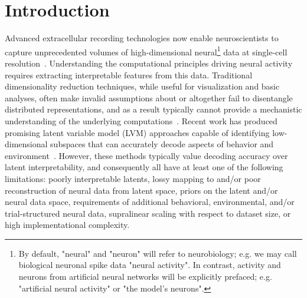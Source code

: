 \section{Introduction}

Advanced extracellular recording technologies now enable neuroscientists to capture unprecedented volumes of high-dimensional neural\footnote{By default, "neural" and "neuron" will refer to neurobiology; e.g. we may call biological neuronal spike data "neural activity". In contrast, activity and neurons from artificial neural networks will be explicitly prefaced; e.g. "artificial neural activity" or "the model's neurons".} data at single-cell resolution~\cite{steinmetz_2021_neuropixels2, raducanu_2017_neuroseeker, cai_2016_miniscope, villette_2019_voltage_2p, ouzounov_2017_three_photon, ahrens_2013_lightsheet}. Understanding the computational principles driving neural activity requires extracting interpretable features from this data. Traditional dimensionality reduction techniques, while useful for visualization and basic analyses, often make invalid assumptions about or altogether fail to disentangle distributed representations, and as a result typically cannot provide a mechanistic understanding of the underlying computations~\cite{cunningham_2014_neural_dr, humphries_2021_dr_principles}. Recent work has produced promising latent variable model (LVM) approaches capable of identifying low-dimensional subspaces that can accurately decode aspects of behavior and environment~\cite{song_2025_langevinflow, schneider_2023_cebra, le_2022_stndt, keshtkaran_2022_autolfads, yu_2009_gpfa, macke_2011_plds, gao_2016_pflds, low_2018_mind, jensen_2020_mgplvm, hernandez_2020_vind, kim_2021_plnde, hurwitz_2021_tndm, schimel_2022_ilqrvae, kudryashova_2023_ctrltndm, ye_2023_ndt2, gondur_2024_mmgpvae, pellegrino_2024_slicetca, sani_2024_dpad, pals_2024_smclr_rnn, zhang_2024_mtm, george_2025_simpl, perkins_2025_mint, schmutz_2025_nce}. However, these methods typically value decoding accuracy over latent interpretability, and consequently all have at least one of the following limitations: poorly interpretable latents, lossy mapping to and/or poor reconstruction of neural data from latent space, priors on the latent and/or neural data space, requirements of additional behavioral, environmental, and/or trial-structured neural data, supralinear scaling with respect to dataset size, or high implementational complexity.

